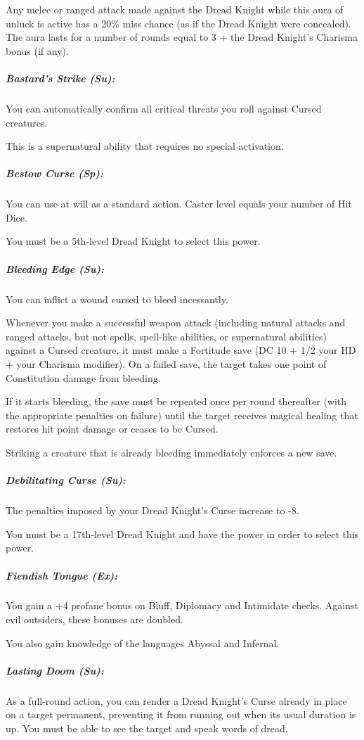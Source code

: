 Any melee or ranged attack made against the Dread Knight while this aura of unluck is active has a 20\% miss chance (as if the Dread Knight were concealed). The aura lasts for a number of rounds equal to 3 + the Dread Knight's Charisma bonus (if any).

\subparagraph{Bastard's Strike (Su):}
You can automatically confirm all critical threats you roll against Cursed creatures.

This is a supernatural ability that requires no special activation.

\subparagraph{Bestow Curse (Sp):}
You can use  at will as a standard action. Caster level equals your number of Hit Dice.

You must be a 5th-level Dread Knight to select this power.
\subparagraph{Bleeding Edge (Su):}
You can inflict a wound cursed to bleed incessantly. 

Whenever you make a successful weapon attack (including natural attacks and ranged attacks, but not spells, spell-like abilities, or supernatural abilities) against a Cursed creature, it must make a Fortitude save (DC 10 + $1/2$ your HD + your Charisma modifier). On a failed save, the target takes one point of Constitution damage from bleeding.

If it starts bleeding, the save must be repeated once per round thereafter (with the appropriate penalties on failure) until the target receives magical healing that restores hit point damage or ceases to be Cursed.

Striking a creature that is already bleeding immediately enforces a new save.

\subparagraph{Debilitating Curse (Su):}
The penalties imposed by your Dread Knight's Curse increase to -8.

You must be a 17th-level Dread Knight and have the  power in order to select this power.

\subparagraph{Fiendish Tongue (Ex):} You gain a +4 profane bonus on Bluff, Diplomacy and Intimidate checks. Against evil outsiders, these bonuses are doubled.

You also gain knowledge of the languages Abyssal and Infernal.

\subparagraph{Lasting Doom (Su):}
As a full-round action, you can render a Dread Knight's Curse already in place on a target permanent, preventing it from running out when its usual duration is up. You must be able to see the target and speak words of dread.

